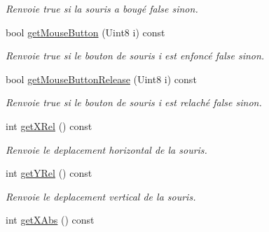 \begin{DoxyCompactItemize}
\begin{DoxyCompactList}\small\item\em Renvoie true si la souris a bougé false sinon. \end{DoxyCompactList}\item 
\hypertarget{classInput_ae1d91a39827387378f2aa7152fdcc482}{bool \hyperlink{classInput_ae1d91a39827387378f2aa7152fdcc482}{get\+Mouse\+Button} (Uint8 i) const }\label{classInput_ae1d91a39827387378f2aa7152fdcc482}

\begin{DoxyCompactList}\small\item\em Renvoie true si le bouton de souris i est enfoncé false sinon. \end{DoxyCompactList}\item 
\hypertarget{classInput_abb05d3dadc328f090cbf71088691bade}{bool \hyperlink{classInput_abb05d3dadc328f090cbf71088691bade}{get\+Mouse\+Button\+Release} (Uint8 i) const }\label{classInput_abb05d3dadc328f090cbf71088691bade}

\begin{DoxyCompactList}\small\item\em Renvoie true si le bouton de souris i est relaché false sinon. \end{DoxyCompactList}\item 
\hypertarget{classInput_a0bda65e8c8f6511c5ed44c38b95ed0a3}{int \hyperlink{classInput_a0bda65e8c8f6511c5ed44c38b95ed0a3}{get\+X\+Rel} () const }\label{classInput_a0bda65e8c8f6511c5ed44c38b95ed0a3}

\begin{DoxyCompactList}\small\item\em Renvoie le deplacement horizontal de la souris. \end{DoxyCompactList}\item 
\hypertarget{classInput_ad761d98ab768e78ce12a5601ba220f06}{int \hyperlink{classInput_ad761d98ab768e78ce12a5601ba220f06}{get\+Y\+Rel} () const }\label{classInput_ad761d98ab768e78ce12a5601ba220f06}

\begin{DoxyCompactList}\small\item\em Renvoie le deplacement vertical de la souris. \end{DoxyCompactList}\item 
\hypertarget{classInput_ab6c06e8b0e7628c175dc5d07a1ccf6d1}{int \hyperlink{classInput_ab6c06e8b0e7628c175dc5d07a1ccf6d1}{get\+X\+Abs} () const }\label{classInput_ab6c06e8b0e7628c175dc5d07a1ccf6d1}


\end{DoxyCompactItemize}
